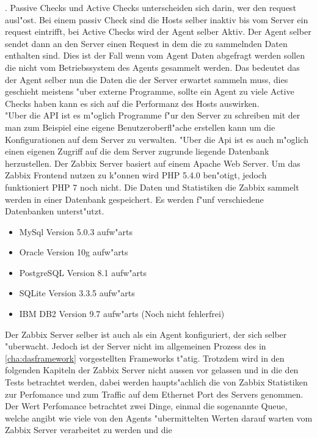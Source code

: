 \autocite{zabbix:activepassive}. Passive Checks und Active Checks unterscheiden sich darin, wer den request %
ausl"ost. Bei einem passiv Check sind die Hosts selber inaktiv bis vom Server ein request eintrifft, bei Active %
Checks wird der Agent selber Aktiv. Der Agent selber sendet dann an den Server einen Request in dem die zu %
sammelnden Daten enthalten sind\autocite{zabbix:activepassive2}. Dies ist der Fall wenn vom Agent Daten abgefragt werden sollen die nicht vom %
Betriebssystem des Agents gesammelt werden. Das bedeutet das der Agent selber nun die Daten die der Server erwartet %
sammeln muss, dies geschieht meistens "uber externe Programme, sollte ein Agent zu viele Active Checks haben kann es %
sich auf die Performanz des Hosts auswirken. \ \\ %

"Uber die API ist es m"oglich Programme f"ur den Server zu schreiben mit der man zum Beispiel %
eine eigene Benutzeroberfl"ache erstellen kann um die Konfigurationen auf dem Server zu verwalten. %
"Uber die Api ist es auch m"oglich einen eigenen Zugriff auf die dem Server zugrunde liegende %
Datenbank herzustellen. %
Der Zabbix Server basiert auf einem Apache Web Server. Um das Zabbix Frontend nutzen zu k"onnen wird %
PHP 5.4.0 ben"otigt, jedoch funktioniert PHP 7 noch nicht. Die Daten und Statistiken die Zabbix sammelt %
werden in einer Datenbank gespeichert. Es werden f"unf verschiedene Datenbanken unterst"utzt. %
\begin{itemize}
\item MySql Version 5.0.3 aufw"arts
\item Oracle Version 10g aufw"arts
\item PostgreSQL Version 8.1 aufw"arts
\item SQLite Version 3.3.5 aufw"arts
\item IBM DB2 Version 9.7 aufw"arts (Noch nicht fehlerfrei)
\end{itemize}
\autocite{zabbix:req}
Der Zabbix Server selber ist auch als ein Agent konfiguriert, der sich selber "uberwacht. Jedoch ist der Server %
nicht im allgemeinen Prozess des in \cref{cha:dasframework} vorgestellten Frameworks t"atig. %
Trotzdem wird in den folgenden Kapiteln der Zabbix Server nicht aussen vor gelassen und in die %
den Tests betrachtet werden, dabei werden haupts"achlich die von Zabbix Statistiken zur Perfomance und zum %
Traffic auf dem Ethernet Port des Servers genommen. Der Wert Perfomance betrachtet zwei Dinge, einmal die sogenannte Queue, welche %
angibt wie viele von den Agents "ubermittelten Werten darauf warten vom Zabbix Server verarbeitet zu werden und die %
